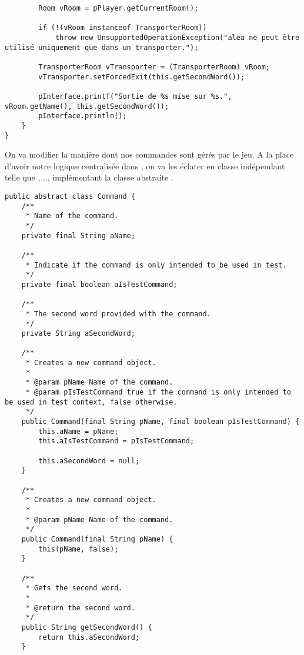 \begin{exercise}[subtitle=Transporter]
\begin{verbatim}
        Room vRoom = pPlayer.getCurrentRoom();

        if (!(vRoom instanceof TransporterRoom))
            throw new UnsupportedOperationException("alea ne peut être utilisé uniquement que dans un transporter.");

        TransporterRoom vTransporter = (TransporterRoom) vRoom;
        vTransporter.setForcedExit(this.getSecondWord());

        pInterface.printf("Sortie de %s mise sur %s.", vRoom.getName(), this.getSecondWord());
        pInterface.println();
    }
}
\end{verbatim}

\end{exercise}

\begin{exercise}[subtitle=Commande abstraite]

On va modifier la manière dont nos commandes sont gérés par le jeu. A la place d'avoir notre logique centralisée dans , on va les éclater en classe indépendant telle que , ... implémentant la classe abstraite .

\begin{verbatim}
public abstract class Command {
    /**
     * Name of the command.
     */
    private final String aName;

    /**
     * Indicate if the command is only intended to be used in test.
     */
    private final boolean aIsTestCommand;

    /**
     * The second word provided with the command.
     */
    private String aSecondWord;

    /**
     * Creates a new command object.
     *
     * @param pName Name of the command.
     * @param pIsTestCommand true if the command is only intended to be used in test context, false otherwise.
     */
    public Command(final String pName, final boolean pIsTestCommand) {
        this.aName = pName;
        this.aIsTestCommand = pIsTestCommand;

        this.aSecondWord = null;
    }

    /**
     * Creates a new command object.
     *
     * @param pName Name of the command.
     */
    public Command(final String pName) {
        this(pName, false);
    }

    /**
     * Gets the second word.
     *
     * @return the second word.
     */
    public String getSecondWord() {
        return this.aSecondWord;
    }


\end{verbatim}
\end{exercise}
